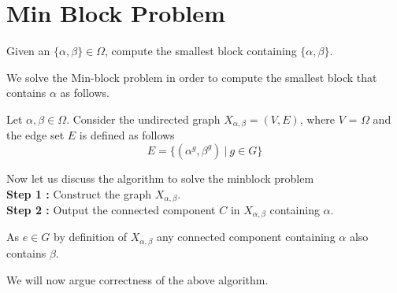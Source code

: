 \section{Min Block Problem}
\label{sec:min-block}
\begin{problem}
Given an $\{\alpha,\beta\}\in\Omega$, compute the smallest block containing $\{\alpha, \beta\}$.
\end{problem}

We solve the Min-block problem in order to compute the smallest block that contains $\alpha$ as follows. 

Let $\alpha,\beta\in\Omega$. Consider the undirected graph $X_{\alpha,\beta}=(V,E)$, where $V$ = $\Omega$ and the edge set $E$ is defined as follows
\[ E = \{(\alpha^{g},\beta^{g}) ~|~ g \in G\} \]

Now let us discuss the algorithm to solve the minblock problem \\
\textbf{Step 1 :} Construct the graph $X_{\alpha,\beta}$.\\
\textbf{Step 2 :} Output the connected component $C$ in $X_{\alpha,\beta}$ containing $\alpha$. 


As $e\in G$  by definition of $X_{\alpha,\beta}$ any connected component containing $\alpha$ also contains $\beta$.
 

We will now argue correctness of the above algorithm. 
 

